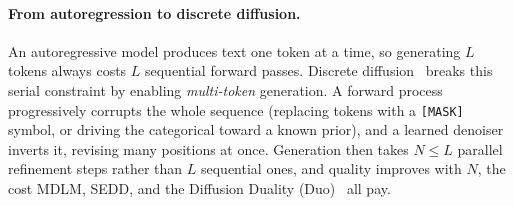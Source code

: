 \documentclass[twocolumn]{style}
\begin{document}
\paragraph{From autoregression to discrete diffusion.} An autoregressive model produces text one token at a time, so generating $L$ tokens always costs $L$ sequential forward passes. Discrete diffusion~\citep{sahoo2024mdlm, lou2023sedd} breaks this serial constraint by enabling \emph{multi-token} generation. A forward process progressively corrupts the whole sequence (replacing tokens with a \texttt{[MASK]} symbol, or driving the categorical toward a known prior), and a learned denoiser inverts it, revising many positions at once. Generation then takes $N\le L$ parallel refinement steps rather than $L$ sequential ones, and quality improves with $N$, the cost MDLM, SEDD, and the Diffusion Duality (Duo)~\citep{sahoo2025duo} all pay.
\end{document}
